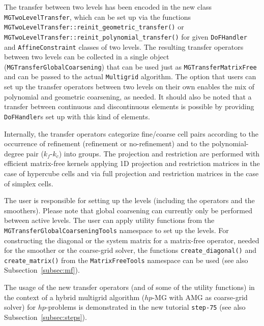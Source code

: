 \documentclass{ansarticle-preprint}
\begin{document}
The transfer between two levels has been encoded in the new class \texttt{MGTwoLevelTransfer}, which can be set up via the functions \texttt{MGTwoLevelTransfer::\allowbreak reinit\_\allowbreak geometric\_\allowbreak transfer()} or \texttt{MGTwo\allowbreak LevelTransfer::\allowbreak reinit\_\allowbreak polynomial\_\allowbreak transfer()} for given
\texttt{DoFHandler} and \texttt{AffineConstraint} classes of two levels. The resulting transfer operators
between two levels can be collected in a single object 
(\texttt{MGTransferGlobalCoarsening}) that can be used just as \texttt{MGTransferMatrixFree} and can be passed to the actual \texttt{Multigrid}
algorithm. The option that users can set up the transfer operators between two levels on their own enables
the mix of polynomial  and geometric coarsening, as needed. It should also be noted that a transfer between continuous
and discontinuous elements is possible by providing \texttt{DoFHandler}s set up with this kind of elements.

Internally, the transfer operators categorize fine/coarse cell pairs according to the 
occurrence of refinement 
(refinement or no-refinement) and to the polynomial-degree pair ($k_f$-$k_c$) into groups. 
The projection and restriction are performed with efficient matrix-free kernels applying
1D projection and restriction matrices in the case of hypercube cells and via full projection and
restriction matrices in the case of simplex cells.


The user is responsible for setting up the levels (including the operators and the
smoothers). Please note that global coarsening can currently only be performed between active levels. 
The user can apply utility
functions from the \texttt{MGTransferGlobalCoarseningTools} namespace to set up the levels. For 
constructing the diagonal or the system matrix for a matrix-free operator,
needed for the smoother or the coarse-grid solver,
the functions \texttt{create\_diagonal()} and \texttt{create\_matrix()} from
the \texttt{MatrixFreeTools} namespace can be used (see also Subsection~\ref{subsec:mf}).


The usage of the new transfer operators (and of some of the utility functions) in the context of a hybrid multigrid algorithm ($hp$-MG with AMG as coarse-grid solver) for $hp$-problems is demonstrated in the new tutorial \texttt{step-75} (see also Subsection~\ref{subsec:steps}).



\end{document}
